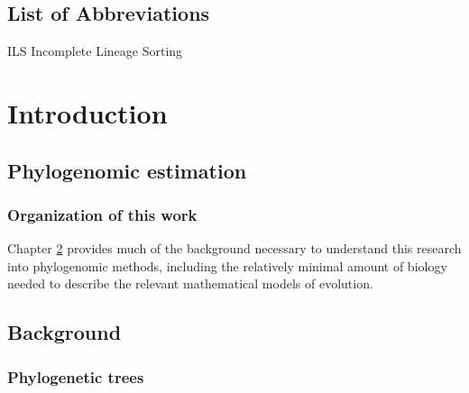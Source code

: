 \documentclass[edeposit,fullpage]{uiucthesis2014}
\theoremstyle{definition}
\begin{document}
\chapter{List of Abbreviations}

\begin{symbollist*}
\item[ILS] Incomplete Lineage Sorting
\end{symbollist*}



\mainmatter
\part{Introduction}

\chapter{Phylogenomic estimation}

\section{Organization of this work}



Chapter \ref{chapter:background} provides much of the background necessary to understand this research into phylogenomic methods, including the relatively minimal amount of biology needed to describe the relevant mathematical models of evolution.

\chapter{Background}
\label{chapter:background}
\section{Phylogenetic trees}
\end{document}
